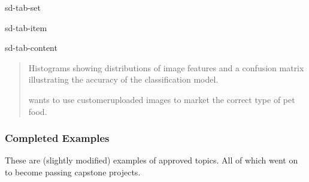 \documentclass[letterpaper,10pt,english]{jupyterBook}
\begin{document}
\begin{sphinxuseclass}{sd-tab-set}
\begin{sphinxuseclass}{sd-tab-item}
\begin{sphinxuseclass}{sd-tab-content}
\begin{quote}
\sphinxAtStartPar
{} Histograms showing distributions of image features and a confusion matrix illustrating the accuracy of the classification model.

\sphinxAtStartPar
{}  wants to use customer\sphinxhyphen{}uploaded images to market the correct type of pet food.
\end{quote}

\end{sphinxuseclass}
\end{sphinxuseclass}
\end{sphinxuseclass}

\subsubsection{Completed Examples}
\label{\detokenize{task1:completed-examples}}\label{\detokenize{task1:task1-examples-completed-examples}}
\sphinxAtStartPar
These are (slightly modified) examples of approved topics. All of which went on to become passing capstone projects.
\end{document}
